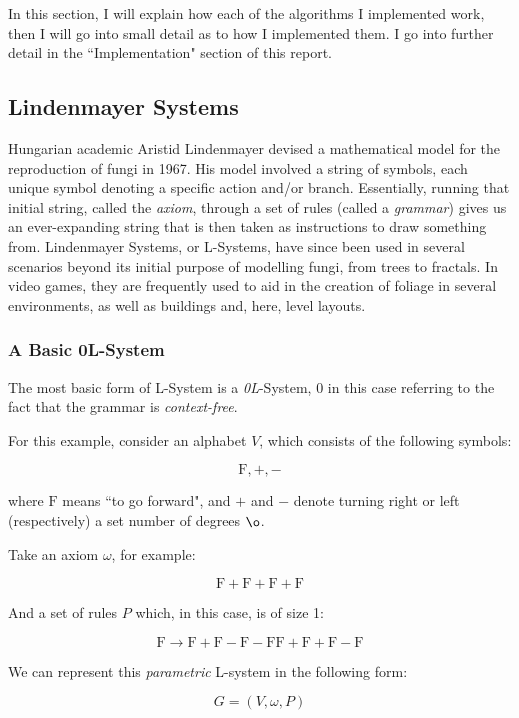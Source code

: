In this section, I will explain how each of the algorithms I implemented work, then I will go into small detail as to how I implemented them. I go into further detail in the ``Implementation" section of this report.

\subsection{Lindenmayer Systems}

Hungarian academic Aristid Lindenmayer devised a mathematical model for the reproduction of fungi in 1967.\cite{LINDENMAYER1968300} His model involved a string of symbols, each unique symbol denoting a specific action and/or branch. Essentially, running that initial string, called the \emph{axiom}, through a set of rules (called a \emph{grammar}) gives us an ever-expanding string that is then taken as instructions to draw something from. Lindenmayer Systems, or L-Systems, have since been used in several scenarios beyond its initial purpose of modelling fungi, from trees to fractals. In video games, they are frequently used to aid in the creation of foliage in several environments, as well as buildings and, here, level layouts.

\subsubsection{A Basic 0L-System}

The most basic form of L-System is a \emph{0L}-System, 0 in this case referring to the fact that the grammar is \emph{context-free}.

For this example\cite{lsyspaulbourke}, consider an alphabet $V$, which consists of the following symbols:

\newcommand{\F}{\mbox{F}}

$$ \F, +, - $$

where $\F$ means ``to go forward", and $+$ and $-$ denote turning right or left (respectively) a set number of degrees $\o$.

Take an axiom $\omega$, for example:

$$ \F+\F+\F+\F $$

And a set of rules $P$ which, in this case, is of size 1:

$$ \F \rightarrow \F+\F-\F-\F\F+\F+\F-\F $$

We can represent this \emph{parametric} L-system in the following form:\cite{enwiki:1124510226}

$$ G = (V, \omega, P) $$

